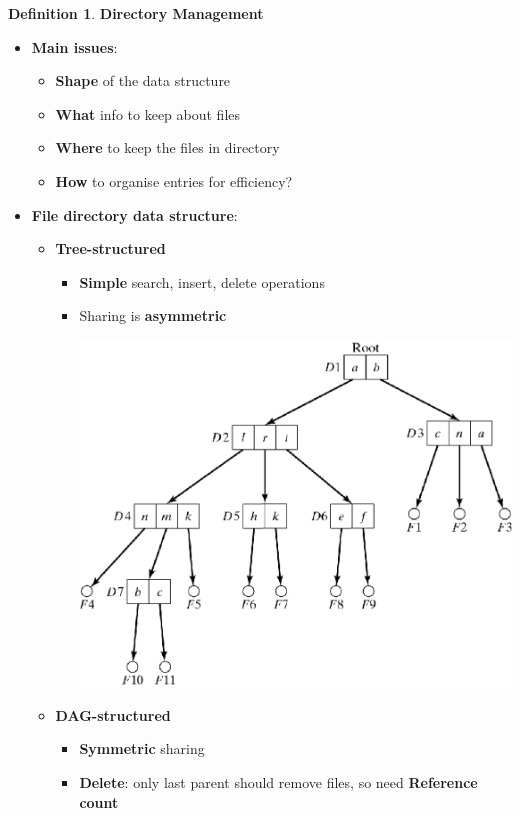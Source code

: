 \documentclass[11pt,a4paper]{article}
\theoremstyle{definition}
\newtheorem{definition}{Definition}[section]
\newenvironment{myitemize}
{ \begin{itemize}
    \setlength{\itemsep}{5pt}
    \setlength{\parskip}{0pt}
    \setlength{\parsep}{0pt}     }
{ \end{itemize}                  }
\begin{document}
\begin{definition}{\textbf{Directory Management}}
\begin{myitemize}
	\item \textbf{Main issues}:
	\begin{myitemize}
		\item \textbf{Shape} of the data structure
		\item \textbf{What} info to keep about files
		\item \textbf{Where} to keep the files in directory
		\item \textbf{How} to organise entries for efficiency?
	\end{myitemize}
	\item \textbf{File directory data structure}:
	\begin{myitemize}
		\item \textbf{Tree-structured}
		\begin{myitemize}
			\item \textbf{Simple} search, insert, delete operations
			\item Sharing is \textbf{asymmetric}
			\begin{center}
				\includegraphics[scale=0.3]{m2/treeStructureFile}
			\end{center}
		\end{myitemize}
		\item \textbf{DAG-structured}
		\begin{myitemize}
			\item \textbf{Symmetric} sharing
			\item \textbf{Delete}: only last parent should remove files, so need \textbf{Reference count}

\end{myitemize}
\end{myitemize}
\end{myitemize}
\end{definition}
\end{document}
